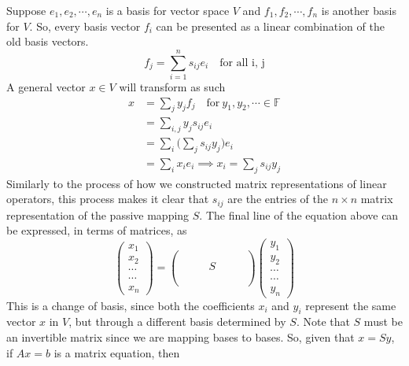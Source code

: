   Suppose ${e_1, e_2, \cdots, e_n}$ is a basis for vector space $V$ and ${f_1, f_2, \cdots, f_n}$ is another basis for $V$. So, every basis vector $f_i$ can be presented as a linear combination of the old basis vectors. 
  \begin{equation}
    f_j = \sum_{i =1}^{n} s_{i j} e_i \quad \text{for all i, j}
  \end{equation}
  A general vector $x \in V$ will transform as such
  \begin{equation} 
    \label{eq1}
    \begin{split}
      x & = \sum_{j} y_j f_j \quad \text{for} \ y_{1}, y_{2}, \cdots \in \mathbb{F} \\
      & = \sum_{i,j} y_j s_{i j} e_i \\
      & = \sum_{i} \Big( \sum_{j} s_{i j} y_j \Big) e_i \\
      & = \sum_{i} x_i e_i \implies x_i = \sum_{j} s_{i j} y_j
    \end{split}
  \end{equation}
  Similarly to the process of how we constructed matrix representations of linear operators, this process makes it clear that $s_{i j}$ are the entries of the $n \times n$ matrix representation of the passive mapping $S$. The final line of the equation above can be expressed, in terms of matrices, as 
  \begin{equation}
    \begin{pmatrix}x_1\\x_2\\\cdots\\\cdots\\x_n\end{pmatrix} = 
    \begin{pmatrix} \\ \\ & & & S & & &  \\\\\\\end{pmatrix} \begin{pmatrix}
    y_1\\y_2\\\cdots\\\cdots\\y_n\end{pmatrix}
  \end{equation}
  This is a change of basis, since both the coefficients $x_i$ and $y_i$ represent the same vector $x$ in $V$, but through a different basis determined by $S$. Note that $S$ must be an invertible matrix since we are mapping bases to bases. So, given that $x = S y$, if $Ax = b$ is a matrix equation, then
